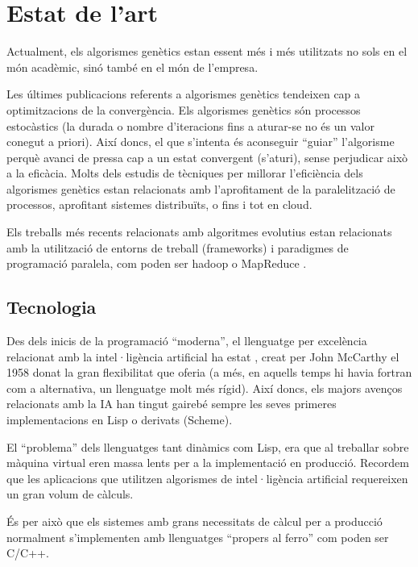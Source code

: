 
\section{Estat de l'art} %
\label{sec:Estat de l'art}

Actualment, els algorismes genètics estan essent més i més utilitzats no sols en
el món acadèmic, sinó també en el món de l'empresa. 


Les últimes publicacions referents a algorismes genètics tendeixen cap a
optimitzacions de la convergència.  Els algorismes genètics són processos
estocàstics (la durada o nombre d'iteracions fins a aturar-se no és un valor
conegut a priori).  Així doncs, el que s'intenta és aconseguir ``guiar''
l'algorisme perquè avanci de pressa cap a un estat convergent (s'aturi), sense
perjudicar això a la eficàcia.  Molts dels estudis de tècniques per millorar
l'eficiència dels algorismes genètics estan relacionats amb l'aprofitament de la
paralelització de processos, aprofitant sistemes distribuïts, o fins i tot en
cloud.  

Els treballs més recents relacionats amb algoritmes evolutius estan relacionats
amb la utilització de entorns de treball (frameworks) i paradigmes de
programació paralela, com poden ser hadoop o MapReduce \cite{VLCG09}.

\subsection{Tecnologia} %
\label{sub:Tecnologia}

Des dels inicis de la programació ``moderna'', el llenguatge per excelència
relacionat amb la intel·ligència artificial ha estat \cite{JMC59}, creat per John
McCarthy el 1958 donat la gran flexibilitat que oferia (a més, en aquells temps
hi havia fortran com a alternativa, un llenguatge molt més rígid).  Així doncs,
els majors avenços relacionats amb la IA han tingut gairebé sempre les seves
primeres implementacions en Lisp o derivats (Scheme).  

El ``problema'' dels llenguatges tant dinàmics com Lisp, era que al treballar sobre
màquina virtual eren massa lents per a la implementació en producció.  Recordem que les
aplicacions que utilitzen algorismes de intel·ligència artificial requereixen un
gran volum de càlculs.

És per això que els sistemes amb grans necessitats de càlcul per a producció
normalment s'implementen amb llenguatges ``propers al ferro'' com poden ser
C/C++. 

